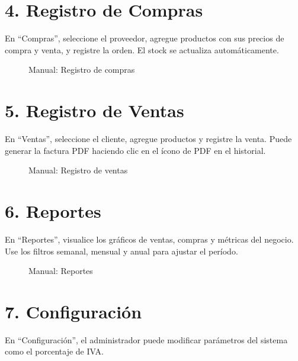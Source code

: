 \documentclass[12pt, letterpaper]{report}
\begin{document}
\section*{4. Registro de Compras}
En ``Compras'', seleccione el proveedor, agregue productos con sus precios de compra y venta, y registre la orden. El stock se actualiza automáticamente.

\begin{figure}[H]
\centering
{}
\caption{Manual: Registro de compras}
\end{figure}

\section*{5. Registro de Ventas}
En ``Ventas'', seleccione el cliente, agregue productos y registre la venta. Puede generar la factura PDF haciendo clic en el ícono de PDF en el historial.

\begin{figure}[H]
\centering
{}
\caption{Manual: Registro de ventas}
\end{figure}

\section*{6. Reportes}
En ``Reportes'', visualice los gráficos de ventas, compras y métricas del negocio. Use los filtros semanal, mensual y anual para ajustar el período.

\begin{figure}[H]
\centering
{}
\caption{Manual: Reportes}
\end{figure}

\section*{7. Configuración}
En ``Configuración'', el administrador puede modificar parámetros del sistema como el porcentaje de IVA.
\end{document}
